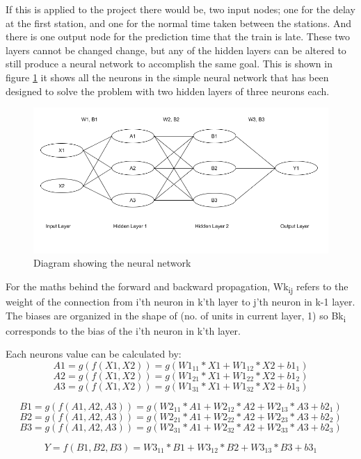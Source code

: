 \documentclass[11pt]{article}
\begin{document}
	If this is applied to the project there would be, two input nodes; one for the delay at the first station, and one for the normal time taken between the stations. And there is one output node for the prediction time that the train is late. These two layers cannot be changed change, but any of the hidden layers can be altered to still produce a neural network to accomplish the same goal. This is shown in figure \ref{Img:NNDiagram} it shows all the neurons in the simple neural network that has been designed to solve the problem with two hidden layers of three neurons each.
	
	\begin{figure}[!htb]
		\begin{center}
			\includegraphics[width=1\textwidth]{Resources/PartTwo/NNDiagram.png}
			\caption{Diagram showing the neural network}
			\label{Img:NNDiagram}
		\end{center}
	\end{figure}
	
	For the maths behind the forward and backward propagation, Wk\textsubscript{ij} refers to the weight of the connection from i’th neuron in k'th layer to j’th neuron in k-1 layer. The biases are organized in the shape of (no. of units in current layer, 1) so Bk\textsubscript{i} corresponds to the bias of the i’th neuron in k'th layer. 
	
	Each neurons value can be calculated by:
	\[A1 = g(f(X1,X2)) = g(W1_{11}*X1 + W1_{12}*X2 + b1_{1})\]
	\[A2 = g(f(X1,X2)) = g(W1_{21}*X1 + W1_{22}*X2 + b1_{2})\]
	\[A3 = g(f(X1,X2)) = g(W1_{31}*X1 + W1_{32}*X2 + b1_{3})\]
	
	\[B1 = g(f(A1,A2,A3)) = g(W2_{11}*A1 + W2_{12}*A2 + W2_{13}*A3 + b2_{1})\]
	\[B2 = g(f(A1,A2,A3)) = g(W2_{21}*A1 + W2_{22}*A2 + W2_{23}*A3 + b2_{2})\]
	\[B3 = g(f(A1,A2,A3)) = g(W2_{31}*A1 + W2_{32}*A2 + W2_{33}*A3 + b2_{3})\]
	
	\[Y = f(B1,B2,B3) = W3_{11}*B1 + W3_{12}*B2 + W3_{13}*B3 + b3_{1}\]
	
\end{document}

